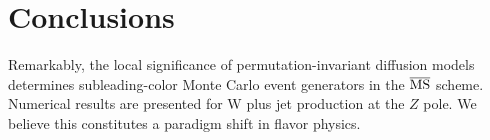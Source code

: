 \section{Conclusions}\label{sec:conclusions}

Remarkably, the local significance of permutation-invariant diffusion
models determines subleading-color Monte Carlo event generators in the
$\overline{\rm MS}$ scheme. Numerical results are presented for W plus
jet production at the $Z$ pole. We believe this constitutes a paradigm
shift in flavor physics.

